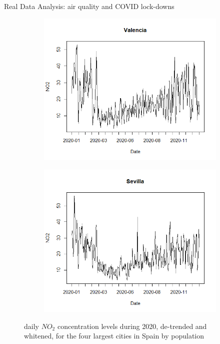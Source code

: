 \documentclass{beamer}
\begin{document}
\begin{frame}{Real Data Analysis: air quality and COVID lock-downs}
{\begin{figure}
\begin{subfigure}[b]{0.3\textwidth}
\end{subfigure}
\vfill
\begin{subfigure}[b]{0.3\textwidth}
    \centering
    \includegraphics[width=\textwidth]{../plots/Valencia-1}
\end{subfigure}
\begin{subfigure}[b]{0.3\textwidth}
    \centering
    \includegraphics[width=\textwidth]{../plots/Sevilla-1}
\end{subfigure}
\caption{daily $NO_2$ concentration levels during 2020, de-trended and whitened, for the four largest cities in Spain by population}
\end{figure}
}


\end{frame}
\end{document}
